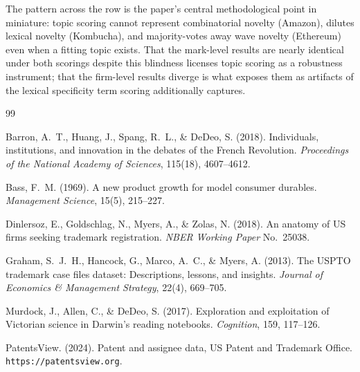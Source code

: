 \documentclass[11pt]{article}
\begin{document}
The pattern across the row is the paper's central methodological point in
miniature: topic scoring cannot represent combinatorial novelty (Amazon),
dilutes lexical novelty (Kombucha), and majority-votes away wave novelty
(Ethereum) even when a fitting topic exists. That the mark-level results
are nearly identical under both scorings despite this blindness licenses
topic scoring as a robustness instrument; that the firm-level results
diverge is what exposes them as artifacts of the lexical specificity term
scoring additionally captures.

{\small
\setlength{\bibsep}{2pt plus 0.3ex}
\begin{thebibliography}{99}

Barron, A.~T., Huang, J., Spang, R.~L., \& DeDeo, S. (2018). Individuals,
institutions, and innovation in the debates of the French Revolution.
\emph{Proceedings of the National Academy of Sciences}, 115(18),
4607--4612.

Bass, F.~M. (1969). A new product growth for model consumer durables.
\emph{Management Science}, 15(5), 215--227.

Dinlersoz, E., Goldschlag, N., Myers, A., \& Zolas, N. (2018). An anatomy
of US firms seeking trademark registration. \emph{NBER Working Paper}
No.\ 25038.

Graham, S.~J.~H., Hancock, G., Marco, A.~C., \& Myers, A. (2013). The USPTO
trademark case files dataset: Descriptions, lessons, and insights.
\emph{Journal of Economics \& Management Strategy}, 22(4), 669--705.

Murdock, J., Allen, C., \& DeDeo, S. (2017). Exploration and exploitation
of Victorian science in Darwin's reading notebooks. \emph{Cognition},
159, 117--126.

PatentsView. (2024). Patent and assignee data, US Patent and Trademark
Office. \texttt{https://patentsview.org}.

\end{thebibliography}
}
\end{document}
